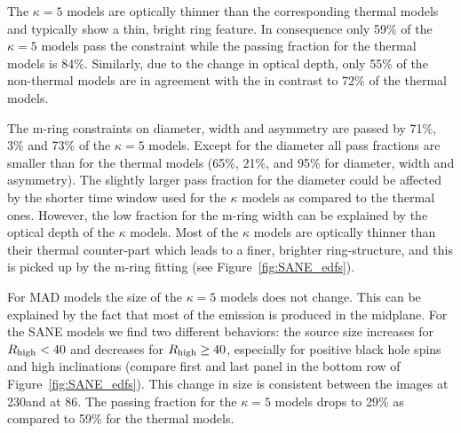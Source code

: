 

The $\kappa=5$ models are optically thinner than the corresponding thermal models and typically show a thin, bright ring feature.
In consequence only 59\% of the $\kappa=5$ models pass the \vam constraint while the passing fraction for the thermal models is 84\%.
Similarly, due to the change in optical depth, only 55\% of the non-thermal models are in agreement with the \vam in contrast to 72\% of the thermal models.


The m-ring constraints on diameter, width and asymmetry are passed by 71\%, 3\% and 73\% of the $\kappa=5$ models.
Except for the diameter all pass fractions are smaller than for the thermal models (65\%, 21\%, and 95\% for diameter, width and asymmetry).
The slightly larger pass fraction for the diameter could be affected by the shorter time window used for the $\kappa$ models as compared to the thermal ones.
However, the low fraction for the m-ring width can be explained by the optical depth of the $\kappa$ models.
Most of the $\kappa$ models are optically thinner than their thermal counter-part which leads to a finer, brighter ring-structure, and this is picked up by the m-ring fitting (see Figure~\ref{fig:SANE_edfs}).


For MAD models the size of the $\kappa=5$ models does not change.
This can be explained by the fact that most of the emission is produced in the midplane.
For the SANE models we find two different behaviors: the source size increases for $R_\mathrm{high} < 40$ and decreases for $R_\mathrm{high} \geq 40$, especially for positive black hole spins and high inclinations (compare first and last panel in the bottom row of Figure~\ref{fig:SANE_edfs}).
This change in size is consistent between the images at 230\GHz and at 86\GHz.
The passing fraction for the $\kappa=5$ models drops to 29\% as compared to 59\% for the thermal models.


